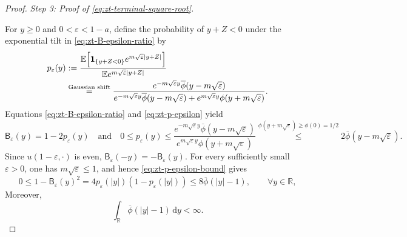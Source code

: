 \documentclass[10pt]{amsart}
\theoremstyle{definition}
\theoremstyle{remark}
\numberwithin{equation}{section}
\newcommand{\R}{\mathbb R}
\newcommand{\E}{\mathbb E}
\newcommand{\1}{\mathbf 1}
\newcommand{\dd}{\,\mathrm d}
\newcommand{\stackref}[2]{\stackrel{#2}{#1}}
\begin{document}
\begin{proof}
\smallskip
\noindent\emph{Step 3: Proof of \eqref{eq:zt-terminal-square-root}.}

For $y\geq0$ and $0<\varepsilon<1-a$, define the probability of $y+Z<0$ under the exponential tilt in \eqref{eq:zt-B-epsilon-ratio} by
\begin{align}
 p_\varepsilon(y)
 &:=\frac{\E\!\left[\1_{\{y+Z<0\}}e^{m\sqrt\varepsilon|y+Z|}\right]}
 {\E e^{m\sqrt\varepsilon|y+Z|}}\notag\\
 &\stackref{=}{\text{Gaussian shift}}
 \frac{e^{-m\sqrt\varepsilon y}\overline\phi(y-m\sqrt\varepsilon)}
 {e^{-m\sqrt\varepsilon y}\overline\phi(y-m\sqrt\varepsilon)
  +e^{m\sqrt\varepsilon y}\phi(y+m\sqrt\varepsilon)}.
 \label{eq:zt-p-epsilon}
\end{align}
Equations \eqref{eq:zt-B-epsilon-ratio} and \eqref{eq:zt-p-epsilon} yield
\begin{equation}
 \mathsf B_\varepsilon(y)=1-2p_\varepsilon(y)
 \quad\text{and}\quad
 0\leq p_\varepsilon(y)
 \leq\frac{e^{-m\sqrt\varepsilon y}\overline\phi(y-m\sqrt\varepsilon)}
 {e^{m\sqrt\varepsilon y}\phi(y+m\sqrt\varepsilon)}
 \stackref{\leq}{\phi(y+m\sqrt\varepsilon)\geq\phi(0)=1/2}
 2\overline\phi(y-m\sqrt\varepsilon).
 \label{eq:zt-p-epsilon-bound}
\end{equation}
Since $u(1-\varepsilon,\cdot)$ is even, $\mathsf B_\varepsilon(-y)=-\mathsf B_\varepsilon(y)$. For every sufficiently small $\varepsilon>0$, one has $m\sqrt\varepsilon\leq1$, and hence \eqref{eq:zt-p-epsilon-bound} gives
\begin{equation}
 0\leq1-\mathsf B_\varepsilon(y)^2
 =4p_\varepsilon(|y|)(1-p_\varepsilon(|y|))
 \leq8\overline\phi(|y|-1),
 \qquad \forall y\in\R,
 \label{eq:zt-boundary-dominator}
\end{equation}
Moreover,
\begin{equation*}
 \int_\R\overline\phi(|y|-1)\dd y<\infty.
\end{equation*}


\end{proof}
\end{document}
